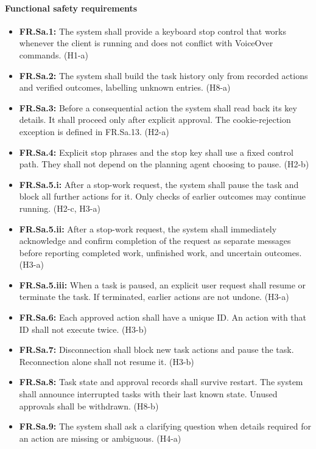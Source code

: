 \documentclass{scrreprt}
\theoremstyle{definition}
\newcommand{\reqtarget}[1]{\hypertarget{req:#1}{#1}}
\begin{document}
\paragraph{Functional safety requirements}
\begin{itemize}
  \item \textbf{\reqtarget{FR.Sa.1}:} The system shall provide a keyboard stop control that works whenever the client is running and does not conflict with VoiceOver commands. (H1-a)
  \item \textbf{\reqtarget{FR.Sa.2}:} The system shall build the task history only from recorded actions and verified outcomes, labelling unknown entries. (H8-a)
  \item \textbf{\reqtarget{FR.Sa.3}:} Before a consequential action the system shall read back its key details. It shall proceed only after explicit approval. The cookie-rejection exception is defined in FR.Sa.13. (H2-a)
  \item \textbf{\reqtarget{FR.Sa.4}:} Explicit stop phrases and the stop key shall use a fixed control path. They shall not depend on the planning agent choosing to pause. (H2-b)
  \item \textbf{\reqtarget{FR.Sa.5.i}:} After a stop-work request, the system shall pause the task and block all further actions for it. Only checks of earlier outcomes may continue running. (H2-c, H3-a)
  \item \textbf{\reqtarget{FR.Sa.5.ii}:} After a stop-work request, the system shall immediately acknowledge and confirm completion of the request as separate messages before reporting completed work, unfinished work, and uncertain outcomes. (H3-a)
  \item \textbf{\reqtarget{FR.Sa.5.iii}:} When a task is paused, an explicit user request shall resume or terminate the task. If terminated, earlier actions are not undone. (H3-a)
  \item \textbf{\reqtarget{FR.Sa.6}:} Each approved action shall have a unique ID. An action with that ID shall not execute twice. (H3-b)
  \item \textbf{\reqtarget{FR.Sa.7}:} Disconnection shall block new task actions and pause the task. Reconnection alone shall not resume it. (H3-b)
  \item \textbf{\reqtarget{FR.Sa.8}:} Task state and approval records shall survive restart. The system shall announce interrupted tasks with their last known state. Unused approvals shall be withdrawn. (H8-b)
  \item \textbf{\reqtarget{FR.Sa.9}:} The system shall ask a clarifying question when details required for an action are missing or ambiguous. (H4-a) 

\end{itemize}
\end{document}
